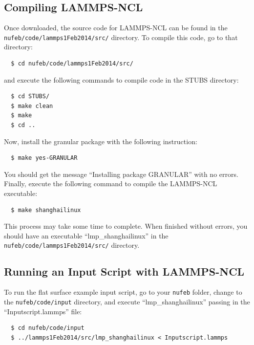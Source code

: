 \documentclass[11pt,a4paper,openright]{article}
\begin{document}
\subsection{Compiling LAMMPS-NCL}

Once downloaded, the source code for LAMMPS-NCL can be found in the {\tt nufeb/code/lammps1Feb2014/src/} directory.  To compile this code, go to that directory:

\begin{verbatim}
  $ cd nufeb/code/lammps1Feb2014/src/
\end{verbatim}

\noindent
and execute the following commands to compile code in the STUBS directory:

\begin{verbatim}
  $ cd STUBS/
  $ make clean
  $ make
  $ cd ..
\end{verbatim}

\noindent
Now, install the granular package with the following instruction:

\begin{verbatim}
  $ make yes-GRANULAR
\end{verbatim}

\noindent
You should get the message ``Installing package GRANULAR'' with no errors.  Finally, execute the following command to compile the LAMMPS-NCL executable:

\begin{verbatim}
  $ make shanghailinux
\end{verbatim}

\noindent
This process may take some time to complete.  When finished without errors, you should have an executable ``lmp\_shanghailinux'' in the \\ {\tt nufeb/code/lammps1Feb2014/src/} directory.

\subsection{Running an Input Script with LAMMPS-NCL}

To run the flat surface example input script, go to your {\tt nufeb} folder, change to the {\tt nufeb/code/input} directory, and execute ``lmp\_shanghailinux'' passing in the ``Inputscript.lammps'' file:

\begin{verbatim}
  $ cd nufeb/code/input
  $ ../lammps1Feb2014/src/lmp_shanghailinux < Inputscript.lammps
\end{verbatim}
\end{document}
